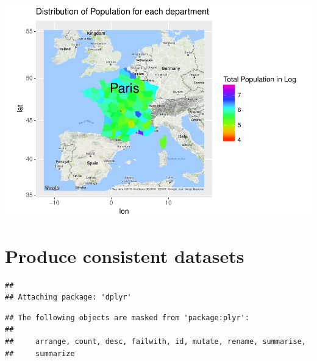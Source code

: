 \documentclass[]{article}
\newenvironment{Shaded}{\begin{snugshade}}{\end{snugshade}}
\newcommand{\KeywordTok}[1]{\textcolor[rgb]{0.13,0.29,0.53}{\textbf{#1}}}
\newcommand{\StringTok}[1]{\textcolor[rgb]{0.31,0.60,0.02}{#1}}
\newcommand{\CommentTok}[1]{\textcolor[rgb]{0.56,0.35,0.01}{\textit{#1}}}
\newcommand{\OperatorTok}[1]{\textcolor[rgb]{0.81,0.36,0.00}{\textbf{#1}}}
\newcommand{\NormalTok}[1]{#1}
\begin{document}
\includegraphics{TSLproject_files/figure-latex/unnamed-chunk-26-1.pdf}

\section{Produce consistent datasets}\label{produce-consistent-datasets}

\begin{Shaded}
\end{Shaded}

\begin{verbatim}
## 
## Attaching package: 'dplyr'
\end{verbatim}

\begin{verbatim}
## The following objects are masked from 'package:plyr':
## 
##     arrange, count, desc, failwith, id, mutate, rename, summarise,
##     summarize
\end{verbatim}
\end{document}
